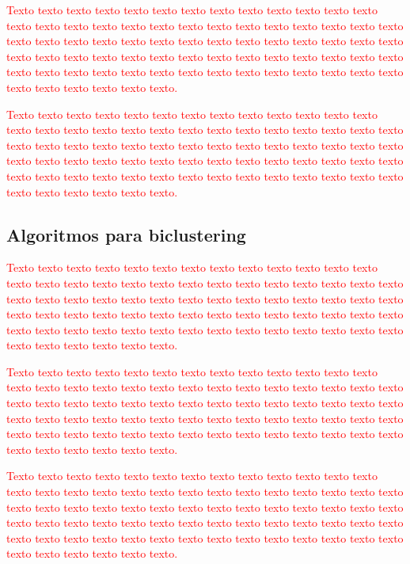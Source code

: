 \documentclass[normaltoc, espacoumemeio, pnumromarab,ruledheader]{abnt}
\begin{document}
	\textcolor{red}{Texto texto texto texto texto texto texto texto texto texto texto texto texto texto texto texto texto texto texto texto texto texto texto texto texto texto texto texto texto texto texto texto texto texto texto texto texto texto texto texto texto texto texto texto texto texto texto texto texto texto texto texto texto texto texto texto texto texto texto texto texto texto texto texto texto texto texto texto texto texto texto texto texto texto texto.}
	
	\textcolor{red}{Texto texto texto texto texto texto texto texto texto texto texto texto texto texto texto texto texto texto texto texto texto texto texto texto texto texto texto texto texto texto texto texto texto texto texto texto texto texto texto texto texto texto texto texto texto texto texto texto texto texto texto texto texto texto texto texto texto texto texto texto texto texto texto texto texto texto texto texto texto texto texto texto texto texto texto.}
	
	 \subsection{Algoritmos para biclustering}
	
	\textcolor{red}{Texto texto texto texto texto texto texto texto texto texto texto texto texto texto texto texto texto texto texto texto texto texto texto texto texto texto texto texto texto texto texto texto texto texto texto texto texto texto texto texto texto texto texto texto texto texto texto texto texto texto texto texto texto texto texto texto texto texto texto texto texto texto texto texto texto texto texto texto texto texto texto texto texto texto texto.}
	
	\textcolor{red}{Texto texto texto texto texto texto texto texto texto texto texto texto texto texto texto texto texto texto texto texto texto texto texto texto texto texto texto texto texto texto texto texto texto texto texto texto texto texto texto texto texto texto texto texto texto texto texto texto texto texto texto texto texto texto texto texto texto texto texto texto texto texto texto texto texto texto texto texto texto texto texto texto texto texto texto.}
	
	\textcolor{red}{Texto texto texto texto texto texto texto texto texto texto texto texto texto texto texto texto texto texto texto texto texto texto texto texto texto texto texto texto texto texto texto texto texto texto texto texto texto texto texto texto texto texto texto texto texto texto texto texto texto texto texto texto texto texto texto texto texto texto texto texto texto texto texto texto texto texto texto texto texto texto texto texto texto texto texto.}
	
\end{document}
